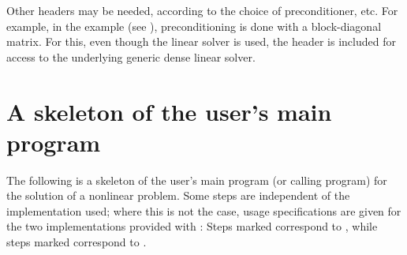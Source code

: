 Other headers may be needed, according to the choice of
preconditioner, etc.  For example, in the 
example (see \cite{kinsol_ex}), preconditioning is done with a
block-diagonal matrix. For this, even though the {\kinspgmr} linear
solver is used, the header  is included for
access to the underlying generic dense linear solver.

\section{A skeleton of the user's main program}\label{s:skeleton_sol}

The following is a skeleton of the user's main program (or calling
program) for the solution of a nonlinear problem. 
Some steps are independent of the {\nvector} implementation used; 
where this is not the case, usage specifications are given for the two implementations 
provided with {\kinsol}: Steps marked {\p} correspond to 
{\nvecp}, while steps marked {\s} correspond to {\nvecs}.
